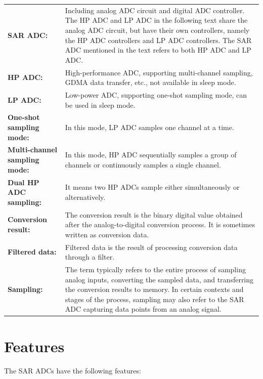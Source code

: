 \documentclass[main\_\_EN.tex]{subfiles}
\begin{document}
\begin{longtable}{ R{6cm} p{10cm} }
\textbf{SAR ADC:} & Including analog ADC circuit and digital ADC controller. The HP ADC and LP ADC in the following text share the analog ADC circuit, but have their own controllers, namely the HP ADC controllers and LP ADC controllers. The SAR ADC mentioned in the text refers to both HP ADC and LP ADC.\\
\textbf{HP ADC:} & High-performance ADC, supporting multi-channel sampling, GDMA data transfer, etc., not available in sleep mode.\\
\textbf{LP ADC:} & Low-power ADC, supporting one-shot sampling mode, can be used in sleep mode.\\
\textbf{One-shot sampling mode:} & In this mode, LP ADC samples one channel at a time. \\
\textbf{Multi-channel sampling mode:} & In this mode, HP ADC sequentially samples a group of channels or continuously samples a single channel.  \\
\textbf{Dual HP ADC sampling:} & It means two HP ADCs sample either simultaneously or alternatively. \\
\textbf{Conversion result:} & The conversion result is the binary digital value obtained after the analog-to-digital conversion process. It is sometimes written as conversion data.\\
\textbf{Filtered data:} & Filtered data is the result of processing conversion data through a filter.\\
\textbf{Sampling:} & The term typically refers to the entire process of sampling analog inputs, converting the sampled data, and transferring the conversion results to memory. In certain contexts and stages of the process, sampling may also refer to the SAR ADC capturing data points from an analog signal.\\
\end{longtable}

\section{Features}

The SAR ADCs have the following features:
\end{document}
